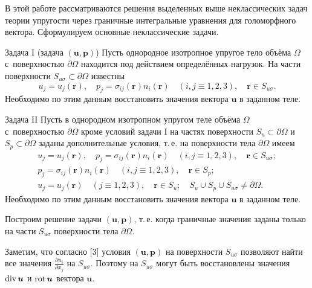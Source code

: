 В этой работе  рассматриваются решения  выделенных выше неклассических задач теории упругости через граничные интегральные уравнения для голоморфного вектора. 
Сформулируем основные неклассические задачи.

\begin{newthm}{Задача I (задача $(\boldsymbol u, \boldsymbol p)$\/)}
Пусть  однородное изотропное упругое тело объёма $\Omega$ с~поверхностью $\partial\Omega$ находится под действием определённых нагрузок. На части поверхности $S_{u\sigma}\subset \partial\Omega$ известны 
$$  
u_{j}=u_{j}(\boldsymbol r), \quad 
p_{j}=\sigma_{ij}(\boldsymbol r)n_{i} (\boldsymbol r) \quad (i, j \equiv 1, 2, 3), \quad \boldsymbol r\in S_{u\sigma}. $$	  
Необходимо 	по этим данным  восстановить значения вектора $\boldsymbol u$ в заданном теле.	  
\end{newthm}	  

\begin{newthm}{Задача II}	  
Пусть в однородном изотропном упругом теле объёма $\Omega$ с~поверхностью $\partial\Omega$ кроме условий задачи {\sc I} на частях поверхности $S_{u}\subset\partial\Omega$ и $S_{p}\subset\partial\Omega$ заданы дополнительные условия, т.\,е. на поверхности тела  $\partial\Omega$ имеем
\begin{gather*}
u_{j}=u_{j}(\boldsymbol r), \quad 
p_{j}=\sigma_{ij}(\boldsymbol r)n_{i} (\boldsymbol r) \quad (i, j \equiv 1, 2, 3), \quad \boldsymbol r\in S_{u\sigma};\\
p_{j}=\sigma_{ij}(\boldsymbol r)n_{i}(\boldsymbol r) \quad (i, j \equiv 1, 2, 3), \quad \boldsymbol r\in S_{p}; \\
u_{j}=u_{j}(\boldsymbol r)\quad (j \equiv 1, 2, 3), \quad  \boldsymbol r\in S_{u}; \quad  S_{u}\cup{S_{p}}\cup{S_{u\sigma}}\neq\partial\Omega.
\end{gather*}
Необходимо 	по этим данным  восстановить значения вектора $\boldsymbol u$ в заданном теле.	  
\end{newthm}	
	 
Построим решение задачи $(\boldsymbol{u}, \boldsymbol{p})$, т.\,е. когда граничные значения заданы только на части $S_{u\sigma}$ поверхности  тела $\partial\Omega $.

Заметим, что согласно [3] условия $(\boldsymbol{u},\boldsymbol{p})$ на поверхности $S_{u\sigma}$ 
позволяют найти все значения  $\frac{\partial u_{i}}{\partial x_{j}}$ на $S_{u\sigma}$.
 Поэтому на $S_{u\sigma}$ могут быть восстановлены значения  $\mathop{\rm div}  \boldsymbol u$ и 
   $\mathop{\rm rot}  \boldsymbol u$ вектора $\boldsymbol{u}$. 

